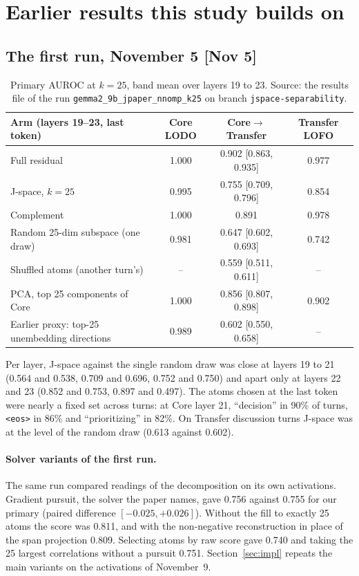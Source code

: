 \documentclass[11pt]{article}
\newcommand{\src}[1]{{\small[#1]}}
\newcommand{\tok}[1]{\texttt{#1}}
\begin{document}
\clearpage
\section{Earlier results this study builds on}\label{app:earlier}
\subsection*{The first run, November 5 \src{Nov 5}}
\begin{table}[H]\centering\small
\begin{tabular}{lccc}\toprule
Arm (layers 19--23, last token) & Core LODO & Core$\to$Transfer & Transfer LOFO\\\midrule
Full residual & 1.000 & 0.902 [0.863, 0.935] & 0.977\\
J-space, $k=25$ & 0.995 & 0.755 [0.709, 0.796] & 0.854\\
Complement & 1.000 & 0.891 & 0.978\\
Random 25-dim subspace (one draw) & 0.981 & 0.647 [0.602, 0.693] & 0.742\\
Shuffled atoms (another turn's) & -- & 0.559 [0.511, 0.611] & --\\
PCA, top 25 components of Core & 1.000 & 0.856 [0.807, 0.898] & 0.902\\
Earlier proxy: top-25 unembedding directions & 0.989 & 0.602 [0.550, 0.658] & --\\\bottomrule
\end{tabular}
\caption{Primary AUROC at $k=25$, band mean over layers 19 to 23. Source: the results file of the run
\texttt{gemma2\_9b\_jpaper\_nnomp\_k25} on branch \texttt{jspace-separability}.}
\end{table}
Per layer, J-space against the single random draw was close at layers 19 to 21 (0.564 and 0.538, 0.709 and 0.696, 0.752
and 0.750) and apart only at layers 22 and 23 (0.852 and 0.753, 0.897 and 0.497). The atoms chosen at the last token were
nearly a fixed set across turns: at Core layer 21, ``decision'' in 90\% of turns, \tok{<eos>} in 86\% and ``prioritizing''
in 82\%. On Transfer discussion turns J-space was at the level of the random draw (0.613 against 0.602).

\paragraph{Solver variants of the first run.} The same run compared readings of the decomposition on its own activations.
Gradient pursuit, the solver the paper names, gave 0.756 against 0.755 for our primary (paired difference
$[-0.025, +0.026]$). Without the fill to exactly 25 atoms the score was 0.811, and with the non-negative reconstruction in
place of the span projection 0.809. Selecting atoms by raw score gave 0.740 and taking the 25 largest correlations without
a pursuit 0.751. Section~\ref{sec:impl} repeats the main variants on the activations of November~9.
\end{document}
